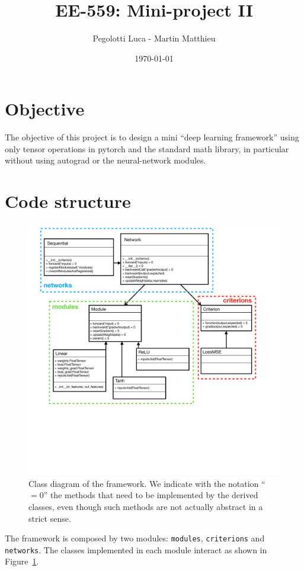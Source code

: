 \documentclass[10pt,final,a4paper]{article}
\begin{document}
\title{EE-559: Mini-project II}
\author{Pegolotti Luca - Martin Matthieu}

\date{\today}
\maketitle


\section{Objective}

The objective of this project is to design a mini “deep learning framework” using only tensor operations in pytorch and the standard math library, in particular without using autograd or the neural-network modules. 

\section{Code structure}
\begin{figure}
\centering
\includegraphics[scale=0.42, clip=true, trim=45 270 90 10]{diagram.pdf}
\caption{Class diagram of the framework. We indicate with the notation ``$=0$'' the methods that need to be implemented by the derived classes, even though such methods are not actually abstract in a strict sense.}
\label{fig:diagram}
\end{figure}
The framework is composed by two modules: \verb|modules|, \verb|criterions| and \verb|networks|. The classes implemented in each module interact as shown in Figure~\ref{fig:diagram}.
\end{document}
